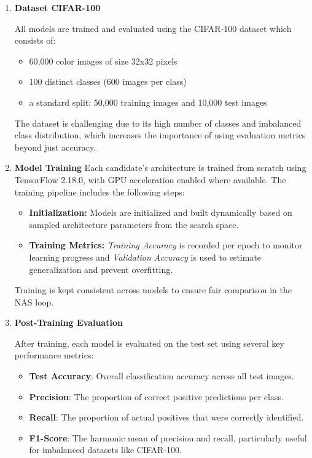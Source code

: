 \begin{enumerate}

    \item \textbf{Dataset CIFAR-100}
    
    All models are trained and evaluated using the CIFAR-100 dataset which consists of:
\begin{itemize}
    \item 60,000 color images of size 32x32 pixels
    \item 100 distinct classes (600 images per class)
\item a standard split: 50,000 training images and 10,000 test images

\end{itemize}
The dataset is challenging due to its high number of classes and imbalanced class distribution, which increases the importance of using evaluation metrics beyond just accuracy.

    \item \textbf{Model Training}
    Each candidate's architecture is trained from scratch using TensorFlow 2.18.0, with GPU acceleration enabled where available. The training pipeline includes the following steps:
    
\begin{itemize}
    \item \textbf{Initialization:} Models are initialized and built dynamically based on sampled architecture parameters from the search space.
    \item \textbf{Training Metrics:} \textit{Training Accuracy} is recorded per epoch to monitor learning progress and \textit{Validation Accuracy} is used to estimate generalization and prevent overfitting.

\end{itemize}

Training is kept consistent across models to ensure fair comparison in the NAS loop.
\item \textbf{Post-Training Evaluation}

After training, each model is evaluated on the test set using several key performance metrics: 
\begin{itemize}
    \item \textbf{Test Accuracy}: Overall classification accuracy across all test images.
    \item \textbf{Precision}: The proportion of correct positive predictions per class.
    \item \textbf{Recall}: The proportion of actual positives that were correctly identified.
    \item \textbf{F1-Score}: The harmonic mean of precision and recall, particularly useful for imbalanced datasets like CIFAR-100.



\end{itemize}
\end{enumerate}
